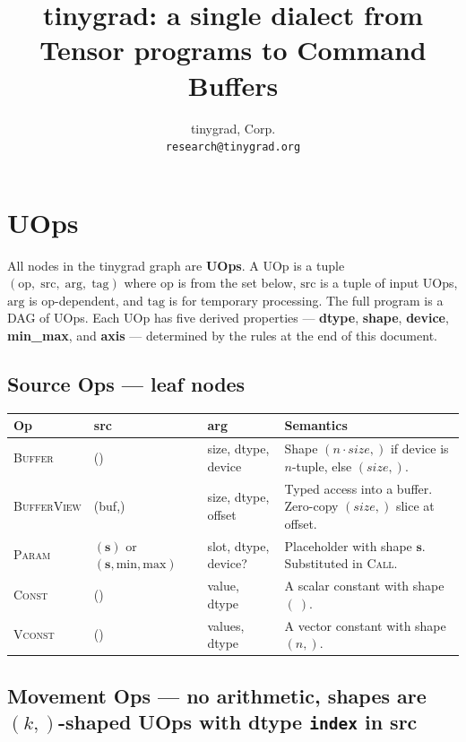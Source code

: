 \documentclass[10pt,letterpaper]{article}
\title{tinygrad: a single dialect from Tensor programs to Command Buffers}
\author{tinygrad, Corp. \\ \texttt{research@tinygrad.org}}
\date{}
\newcommand{\op}[1]{\textsc{#1}}
\begin{document}
\maketitle
\thispagestyle{empty}

\section*{UOps}

All nodes in the tinygrad graph are \textbf{UOps}. A UOp is a tuple $(\mathrm{op},\;\mathrm{src},\;\mathrm{arg},\;\mathrm{tag})$ where $\mathrm{op}$ is from the set below, $\mathrm{src}$ is a tuple of input UOps, $\mathrm{arg}$ is op-dependent, and $\mathrm{tag}$ is for temporary processing. The full program is a DAG of UOps. Each UOp has five derived properties --- \textbf{dtype}, \textbf{shape}, \textbf{device}, \textbf{min\_max}, and \textbf{axis} --- determined by the rules at the end of this document.

\subsection*{Source Ops \normalfont\small--- leaf nodes}

\begin{tabular}{@{}l l l l@{}}
\toprule
\textbf{Op} & \textbf{src} & \textbf{arg} & \textbf{Semantics} \\
\midrule
\op{Buffer} & () & size, dtype, device &
  Shape $(n \cdot \textit{size},)$ if device is $n$-tuple, else $(\textit{size},)$. \\
\op{BufferView} & (buf,) & size, dtype, offset &
  Typed access into a buffer. Zero-copy $(\textit{size},)$ slice at offset. \\
\op{Param} & $(\mathbf{s})$ or $(\mathbf{s}, \text{min}, \text{max})$ & slot, dtype, device? &
  Placeholder with shape $\mathbf{s}$. Substituted in \op{Call}. \\[4pt]
\op{Const} & () & value, dtype &
  A scalar constant with shape $(\ )$. \\
\op{Vconst} & () & values, dtype &
  A vector constant with shape $(n,)$. \\
\bottomrule
\end{tabular}

\subsection*{{\color{movgreen}Movement Ops} \normalfont\small--- no arithmetic, shapes are $(k,)$-shaped UOps with dtype \texttt{index} in src}
\end{document}

